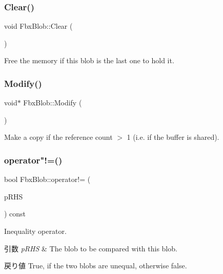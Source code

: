 \subsubsection{\texorpdfstring{Clear()}{Clear()}}
{\footnotesize\ttfamily void Fbx\+Blob\+::\+Clear (\begin{DoxyParamCaption}{ }\end{DoxyParamCaption})}



Free the memory if this blob is the last one to hold it. 

\mbox{\label{class_fbx_blob_a18bd3fbf233e39091ffcf0ef65123023}} 
\subsubsection{\texorpdfstring{Modify()}{Modify()}}
{\footnotesize\ttfamily void$\ast$ Fbx\+Blob\+::\+Modify (\begin{DoxyParamCaption}{ }\end{DoxyParamCaption})}



Make a copy if the reference count $>$ 1 (i.\+e. if the buffer is shared). 

\mbox{\label{class_fbx_blob_a8a37da8658286521abc8c085f1fdbb69}} 
\subsubsection{\texorpdfstring{operator"!=()}{operator!=()}}
{\footnotesize\ttfamily bool Fbx\+Blob\+::operator!= (\begin{DoxyParamCaption}\item[{const \hyperlink{class_fbx_blob}{Fbx\+Blob} \&}]{p\+R\+HS }\end{DoxyParamCaption}) const}

Inequality operator. 
\begin{DoxyParams}{引数}
{\em p\+R\+HS} & The blob to be compared with this blob. \\
\hline
\end{DoxyParams}
\begin{DoxyReturn}{戻り値}
{\ttfamily True}, if the two blobs are unequal, otherwise false. 
\end{DoxyReturn}
\mbox{\label{class_fbx_blob_aaa69c14d3d6ad7c6720957cd6c08712a}} 
